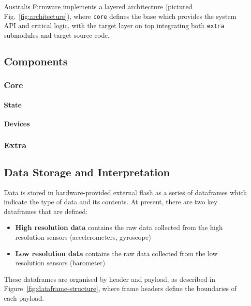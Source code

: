 Australis Firmware implements a layered architecture (pictured Fig.~\ref{fig:architecture}), where \verb|core| defines the base which provides the system API and critical logic, with the target layer on top integrating both \verb|extra| submodules and target source code.

\subsection{Components}

\subsubsection{Core}
\paragraph{State}
\paragraph{Devices}

\subsubsection{Extra}

\subsection{Data Storage and Interpretation}
Data is stored in hardware-provided external flash as a series of dataframes which indicate the type of data and its contents. At present, there are two key dataframes that are defined: 

\begin{itemize}
    \item \textbf{High resolution data} contains the raw data collected from the high resolution sensors (accelerometers, gyroscope)
    \item \textbf{Low resolution data} contains the raw data collected from the low resolution sensors (barometer)
\end{itemize}

These dataframes are organised by header and payload, as described in Figure~\ref{fig:dataframe-structure}, where frame headers define the boundaries of each payload.

